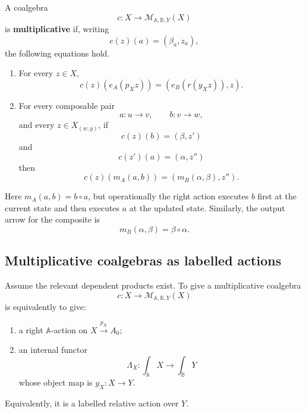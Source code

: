 \begin{definition}
\label{def:poly-relative-multiplicative-response-coalgebra}
A coalgebra
\[
c:X\to\mathcal M_{\mathbb A,\mathbb B,Y}(X)
\]
is \textbf{multiplicative} if, writing
\[
c(z)(a)=(\beta_a,z_a),
\]
the following equations hold.
\begin{enumerate}
\item For every \(z\in X\),
\[
c(z)(e_A(p_Xz))
=
(e_B(r(y_Xz)),z).
\]

\item For every composable pair
\[
a:u\to v,
\qquad
b:v\to w,
\]
and every \(z\in X_{(w,y)}\), if
\[
c(z)(b)=(\beta,z')
\]
and
\[
c(z')(a)=(\alpha,z'')
\]
then
\[
c(z)(m_A(a,b))
=
(m_B(\alpha,\beta),z'').
\]
\end{enumerate}
\end{definition}

Here \(m_A(a,b)=b\circ a\), but operationally the right action executes \(b\)
first at the current state and then executes \(a\) at the updated state.
Similarly, the output arrow for the composite is
\[
m_B(\alpha,\beta)=\beta\circ\alpha.
\]

\subsection{Multiplicative coalgebras as labelled actions}
\label{subsec:poly-relative-coalgebras-labelled-actions}

\begin{proposition}
\label{prop:poly-relative-coalgebras-labelled-actions}
Assume the relevant dependent products exist.  To give a multiplicative
coalgebra
\[
c:X\to\mathcal M_{\mathbb A,\mathbb B,Y}(X)
\]
is equivalently to give:
\begin{enumerate}
\item a right \(\mathbb A\)-action on \(X\xrightarrow{p_X}A_0\);
\item an internal functor
\[
\Lambda_X:\int_{\mathbb A}X\to\int_{\mathbb B}Y
\]
whose object map is \(y_X:X\to Y\).
\end{enumerate}
Equivalently, it is a labelled relative action over \(Y\).
\end{proposition}

